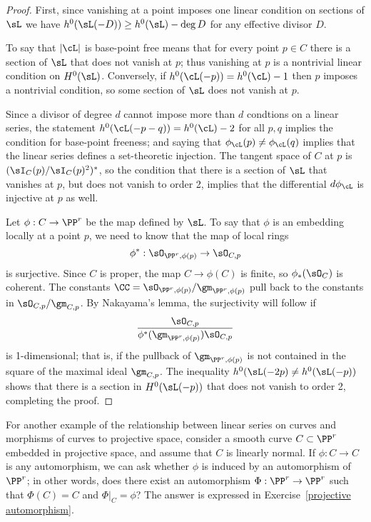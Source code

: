 \begin{proof}
First, since vanishing at a point imposes one linear condition on sections of $\sL$ we have $h^0(\sL(-D)) \geq h^0(\sL)-\deg D$ for any
effective divisor $D$.

To say that $|\cL|$ is base-point free means that for every point $p\in C$ there is a section of $\sL$ that does not vanish at $p$; thus vanishing
at $p$ is a nontrivial linear condition on $H^0(\sL)$. Conversely, if $h^0(\cL(-p)) = h^0(\cL) - 1$ then $p$ imposes a nontrivial condition, so
some section of $\sL$ does not vanish at $p$.

Since a divisor of degree $d$ cannot impose more than $d$ condtions on a linear series, the statement $h^0(\cL(-p-q)) = h^0(\cL) - 2$ for all $p, q$ implies the condition for base-point freeness; and saying that $\phi_\cL(p) \neq \phi_\cL(q)$ implies that the linear series defines a set-theoretic injection. The tangent space of $C$ at $p$ is $(\sI_C(p)/\sI_C(p)^2)^*$, so the condition that there is a section of $\sL$ that vanishes at $p$, but does not vanish
to order 2, implies that the differential $d\phi_\cL$ is injective at $p$ as well.

Let $\phi:C \to \PP^r$ be the map defined by $\sL$. To say that $\phi$  is an embedding locally at a point $p$, we need to know that the map of local rings
$$
\phi^*: \sO_{\PP^r,\phi(p)} \to \sO_{C,p} 
$$
is surjective. Since $C$ is proper, the map $C\to \phi(C)$ is finite,
so $\phi_*(\sO_{C})$ is coherent.
 The constants  $\CC =\sO_{\PP^r,\phi(p)}/\gm_{\PP^r,\phi(p)}$ pull back to the constants in
$\sO_{C,p}/\gm_{C,p}$. 
By Nakayama's lemma, the surjectivity will follow if 
$$
\frac{\sO_{C,p}}
{\phi^*(\gm_{\PP^r,\phi(p)})  \sO_{C,p}}
$$
is 1-dimensional; that is, if  the pullback of $\gm_{\PP^r,\phi(p)}$ is not contained in the square of the
maximal ideal $\gm_{C,p}$. The inequality $h^0(\sL(-2p) \neq h^0(\sL(-p))$ shows that there is a 
section in $H^0(\sL(-p))$ that does not vanish to order 2, completing the proof.
\end{proof}


For another example of the relationship between linear series on curves and morphisms of curves to projective space, consider a smooth curve $C \subset \PP^r$ embedded in projective space, and assume that $C$ is linearly normal. If $\phi : C \to C$ is any automorphism, we can ask whether $\phi$ is induced by an automorphism of $\PP^r$; in other words, does there exist an automorphism $\Phi : \PP^r \to \PP^r$ such that $\Phi(C) = C$ and $\Phi|_C = \phi$? The answer is expressed in Exercise~\ref{projective automorphism}.


